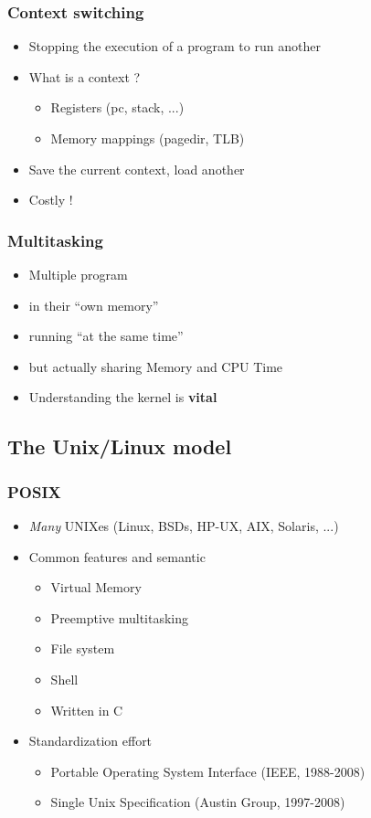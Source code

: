 \begin{frame}
  \frametitle{Context switching}

  \begin{itemize}
  \item Stopping the execution of a program to run another
  \item What is a context ?
    \begin{itemize}
    \item Registers (pc, stack, ...)
    \item Memory mappings (pagedir, TLB)
    \end{itemize}
  \item Save the current context, load another
  \item Costly !
  \end{itemize}
\end{frame}


\begin{frame}
  \frametitle{Multitasking}

  \begin{itemize}
  \item Multiple program
  \item in their ``own memory''
  \item running ``at the same time''
  \item but actually sharing Memory and CPU Time
  \item Understanding the kernel is \textbf{vital}
  \end{itemize}
\end{frame}





\subsection{The Unix/Linux model}
\label{subsec:linuxmodel}


\begin{frame}
  \frametitle{POSIX}

  \begin{itemize}
  \item \emph{Many} UNIXes (Linux, BSDs, HP-UX, AIX, Solaris, ...)
  \item Common features and semantic
    \begin{itemize}
    \item Virtual Memory
    \item Preemptive multitasking
    \item File system
    \item Shell
    \item Written in C
    \end{itemize}
  \item Standardization effort
    \begin{itemize}
    \item Portable Operating System Interface (IEEE, 1988-2008)
    \item Single Unix Specification (Austin Group, 1997-2008)
    \end{itemize}
  \end{itemize}
\end{frame}


